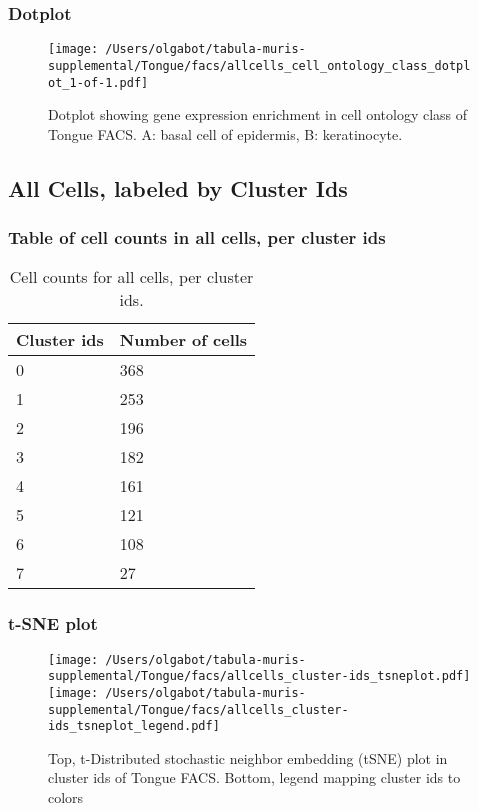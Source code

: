 \newpage
\newpage
\subsubsection{Dotplot}
\begin{figure}[h]
\centering
\texttt{[image: /Users/olgabot/tabula-muris-supplemental/Tongue/facs/allcells\_cell\_ontology\_class\_dotplot\_1-of-1.pdf]}

\caption{ Dotplot  showing gene expression enrichment in cell ontology class of Tongue FACS. A: basal cell of epidermis, B: keratinocyte.}
\end{figure}


\newpage
\subsection{All Cells, labeled by Cluster Ids}
\subsubsection{Table of cell counts in all cells, per cluster ids}\begin{table}[h]
\centering
\label{my-label}
\begin{tabular}{@{}ll@{}}
\toprule

Cluster ids& Number of cells \\ \midrule
0 & 368 \\

1 & 253 \\

2 & 196 \\

3 & 182 \\

4 & 161 \\

5 & 121 \\

6 & 108 \\

7 & 27 \\
\bottomrule
\end{tabular}
\caption{Cell counts for all cells, per cluster ids.}
\end{table}

\newpage
\subsubsection{t-SNE plot}
\begin{figure}[h]
\centering
\texttt{[image: /Users/olgabot/tabula-muris-supplemental/Tongue/facs/allcells\_cluster-ids\_tsneplot.pdf]}
\texttt{[image: /Users/olgabot/tabula-muris-supplemental/Tongue/facs/allcells\_cluster-ids\_tsneplot\_legend.pdf]}
\caption{Top, t-Distributed stochastic neighbor embedding (tSNE) plot  in cluster ids of Tongue FACS. Bottom, legend mapping cluster ids to colors}
\end{figure}


